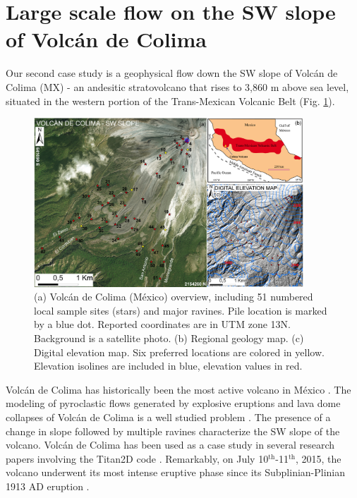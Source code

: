 \documentclass{article}
\begin{document}
\section{Large scale flow on the SW slope of Volc{\'a}n de Colima}\label{QoI2}
Our second case study is a geophysical flow down the SW slope of Volc{\'a}n de Colima (MX) - an andesitic stratovolcano that rises to 3,860 m above sea level, situated in the western portion of the Trans-Mexican Volcanic Belt (Fig. \ref{fig:Colima-first}).
\begin{figure}[H]
    \includegraphics[width=0.9\textwidth]{BAF_VolcanDeColima/ColimaFig.jpg}
    \centering
    \caption{(a) Volc{\'a}n de Colima (M{\'e}xico) overview, including 51 numbered local sample sites (stars) and major ravines. Pile location is marked by a blue dot. Reported coordinates are in UTM zone 13N. Background is a satellite photo. (b) Regional geology map. (c) Digital elevation map. Six preferred locations are colored in yellow. Elevation isolines are included in blue, elevation values in red.}
    \label{fig:Colima-first}
\end{figure}
Volc{\'a}n de Colima has historically been the most active volcano in M{\'e}xico \citep{DeLaCruzReina1993, Zobin2002, Gonzalez2002}. The modeling of pyroclastic flows generated by explosive eruptions and lava dome collapses of Volc{\'a}n de Colima is a well studied problem \citep{DelPozzo1995,Sheridan1995,Saucedo2002,Saucedo2004,Saucedo2005,Sarocchi2011,Capra2015}. The presence of a change in slope followed by multiple ravines characterize the SW slope of the volcano. Volc{\'a}n de Colima has been used as a case study in several research papers involving the Titan2D code \citep{Rupp2004, Rupp2006, Dalbey2008, Yu2009, Sulpizio2010, Capra2011, Aghakhani2016}. Remarkably, on July 10$^{\mathrm{th}}$-11$^{\mathrm{th}}$, 2015, the volcano underwent its most intense eruptive phase since its Subplinian-Plinian 1913 AD eruption \citep{Saucedo2010, Zobin2015, ReyesDaVilla2016, Capra2016, Macorps2017}.
\end{document}
